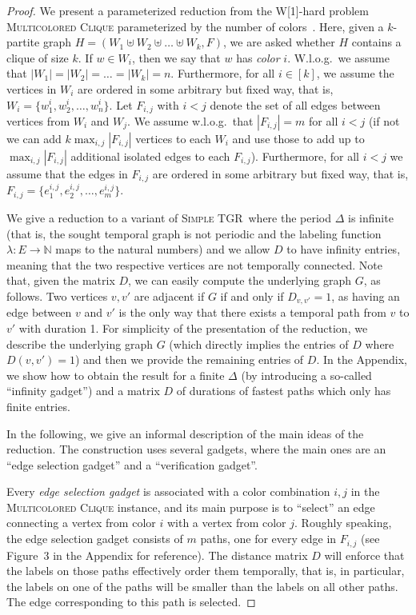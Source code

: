 \documentclass[a4paper,UKenglish,cleveref, autoref, thm-restate, anonymous]{lipics-v2021}
\newcommand{\deltaExact}{\textsc{Simple TGR}}
\begin{document}
\begin{proof}
    We present a parameterized reduction from the W[1]-hard problem \textsc{Multicolored Clique} parameterized by the number of colors~\cite{fellows2009multipleinterval}.  Here, given a $k$-partite graph $H=(W_1\uplus W_2 \uplus\ldots\uplus W_k, F)$, we are asked whether $H$ contains a clique of size $k$. If $w\in W_i$, then we say that $w$ has \emph{color} $i$. W.l.o.g.\ we assume that $|W_1|=|W_2|=\ldots=|W_k|=n$. 
    Furthermore, for all $i\in[k]$, we assume the vertices in $W_i$ are ordered in some arbitrary but fixed way, that is, $W_i=\{w^i_1,w^i_2,\ldots,w^i_n\}$.
    Let $F_{i,j}$ with $i<j$ denote the set of all edges between vertices from $W_i$ and $W_j$. We assume w.l.o.g.\ that $|F_{i,j}|=m$ for all $i< j$ (if not we can add $k \max_{i,j}|F_{i,j}|$ vertices to each $W_i$ and use those to add up to $\max_{i,j}|F_{i,j}|$ additional isolated edges to each $F_{i,j}$).
    Furthermore, for all $i<j$ we assume that the edges in $F_{i,j}$ are ordered in some arbitrary but fixed way, that is, $F_{i,j}=\{e^{i,j}_1,e^{i,j}_2,\ldots,e^{i,j}_m\}$.

We give a reduction to a variant of \deltaExact\ where the period $\Delta$ is infinite (that is, the sought temporal graph is not periodic and the labeling function $\lambda : E\rightarrow \mathbb{N}$ maps to the natural numbers) and we allow $D$ to have infinity entries, meaning that the two respective vertices are not temporally connected. 
Note that, given the matrix $D$, we can easily compute the underlying graph $G$, as follows. Two vertices $v,v'$ are adjacent if $G$ if and only if $D_{v,v'}=1$, as having an edge between $v$ and $v'$ is the only way that there exists a temporal path from $v$ to $v'$ with duration 1. 
For simplicity of the presentation of the reduction, we describe the underlying graph $G$ (which directly implies the entries of $D$ where $D(v,v')=1$) and then we provide the remaining entries of $D$. 
In the Appendix, we show how to obtain the result for a finite $\Delta$ (by introducing a so-called ``infinity gadget'') and a matrix $D$ of durations of fastest paths which only has finite entries. 




In the following, we give an informal description of the main ideas of the reduction. The construction uses several gadgets, where the main ones are an ``edge selection gadget'' and a ``verification gadget''.


Every \emph{edge selection gadget} is associated with a color combination $i,j$ in the \textsc{Multicolored Clique} instance, and its main purpose is to ``select'' an edge connecting a vertex from color $i$ with a vertex from color $j$.
Roughly speaking, the edge selection gadget consists of $m$ paths, one for every edge in $F_{i,j}$ (see Figure~3 in the Appendix for reference). The distance matrix $D$ will enforce that the labels on those paths effectively order them temporally, that is, in particular, the labels on one of the paths will be smaller than the labels on all other paths. The edge corresponding to this path is selected.



\end{proof}
\end{document}
